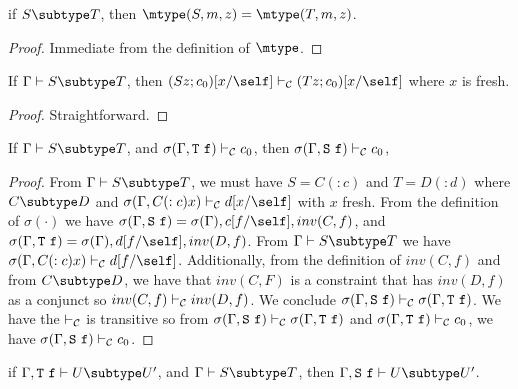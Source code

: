 \begin{lemma}
\label{lemmatwo} %
if   $S \subtype T$,
then $\mtype(S,m,z) = \mtype(T,m,z)$.
\end{lemma}

\begin{proof}
Immediate from the definition of $\mtype$.
\end{proof}

\begin{lemma}
\label{existential-subtyping}
If   $\Gamma \vdash S \subtype T$,
then $(S z; c_0)[x/\self] \vdash_{\cal C} (T z; c_0)[x/\self]$
where $x$ is fresh.
\end{lemma}

\begin{proof}
Straightforward.
\end{proof}

\begin{lemma}
\label{lemmafour} %
If   $\Gamma \vdash S \subtype T$,
and  $\sigma(\Gamma,{\tt T}\ {\tt f}) \vdash_{\cal C} c_0$,
then $\sigma(\Gamma,{\tt S}\ {\tt f}) \vdash_{\cal C} c_0$,
\end{lemma}

\begin{proof}
From $\Gamma \vdash S \subtype T$,
we must have $S = C(:c)$ and $T = D(:d)$
where
$C \subtype D$
and
$\sigma(\Gamma, C(:c) x) \vdash_{\cal C} d[x/\self]$
with $x$ fresh.
From the definition of $\sigma(\cdot)$ we have
    $\sigma(\Gamma,{\tt S}\ {\tt f}) = \sigma(\Gamma), c[f/\self], inv(C,f)$,
and $\sigma(\Gamma,{\tt T}\ {\tt f}) = \sigma(\Gamma), d[f/\self], inv(D,f)$.
From $\Gamma \vdash S \subtype T$ we have 
$\sigma(\Gamma, C(:c) x) \vdash_{\cal C} d[f/\self]$.
Additionally, from the definition of $inv(C,f)$ and
from $C \subtype D$, 
we have that $inv(C,F)$ is a constraint that has $inv(D,f)$ as a conjunct so 
$inv(C,f) \vdash_{\cal C} inv(D,f)$.
We conclude
$\sigma(\Gamma,{\tt S}\ {\tt f}) \vdash_{\cal C} 
\sigma(\Gamma,{\tt T}\ {\tt f})$.
We have the $\vdash_{\cal C}$ is transitive so 
from $\sigma(\Gamma,{\tt S}\ {\tt f}) \vdash_{\cal C}
\sigma(\Gamma,{\tt T}\ {\tt f})$
and
$\sigma(\Gamma,{\tt T}\ {\tt f}) \vdash_{\cal C} c_0$,
we have 
$\sigma(\Gamma,{\tt S}\ {\tt f}) \vdash_{\cal C} c_0$.
\end{proof}

\begin{lemma}
\label{lemmathree} %
if   $\Gamma, {\tt T}\ {\tt f} \vdash U \subtype U'$,
and  $\Gamma \vdash S \subtype T$,
then $\Gamma, {\tt S}\ {\tt f} \vdash U \subtype U'$.
\end{lemma}

